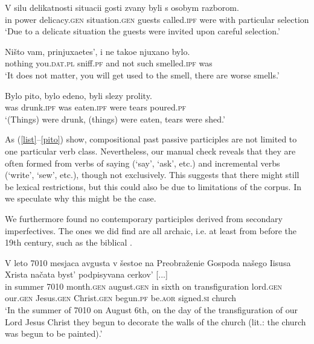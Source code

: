 \documentclass[output=paper,modfonts,newtxmath,hidelinks
\ChapterDOI{10.5281/zenodo.2545513}
]{langscibook}
\begin{document}
\ea\gll	V silu delikatnosti situacii gosti zvany byli s osobym razborom. \label{zvany}\\
	in power delicacy.\textsc{gen} situation.\textsc{gen} guests called.\textsc{ipf} were with particular selection\\
\glt	`Due to a delicate situation the guests were invited upon careful selection.'
\z

\ea\gll	Ništo vam, prinjuxaetes', i ne takoe njuxano bylo. \label{njuxano}\\ 
	nothing you.\textsc{dat}.\textsc{pl} sniff.\textsc{pf} and not such smelled.\textsc{ipf} was\\
\glt	`It does not matter, you will get used to the smell, there are worse smells.'
\z

\ea\gll	Bylo pito, bylo edeno, byli slezy prolity. \label{pito}\\
	was drunk.\textsc{ipf} was eaten.\textsc{ipf} were tears poured.\textsc{pf}\\
\glt	`(Things) were drunk, (things) were eaten, tears were shed.'
\z

\noindent As (\ref{list}--\ref{pito}) show, compositional  past passive participles are not limited to one particular verb class. Nevertheless, our manual check reveals that they are often formed from verbs of saying (`say', `ask', etc.) and incremental verbs (`write', `sew', etc.), though not exclusively. This suggests that there might still be lexical restrictions, but this could also be due to limitations of the corpus. In  we speculate why this might be the case. 

We furthermore found no contemporary participles derived from secondary imperfectives. The ones we did find are all archaic, i.e. at least from before the 19th century, such as the biblical . 

\ea\gll	V leto 7010 mesjaca avgusta v šestoe na Preobraženie Gospoda našego Iisusa Xrista načata byst' podpisyvana cerkov' [...] \label{7010} \\
	in summer 7010 month.\textsc{gen} august.\textsc{gen} in sixth on transfiguration lord.\textsc{gen} our.\textsc{gen} Jesus.\textsc{gen} Christ.\textsc{gen} begun.\textsc{pf} be.\textsc{aor} signed.\textsc{si} church \\ 
\glt    `In the summer of 7010 on August 6th, on the day of the transfiguration of our Lord Jesus Christ they begun to decorate the walls of the church (lit.: the church was begun to be painted).'
\z
\end{document}
